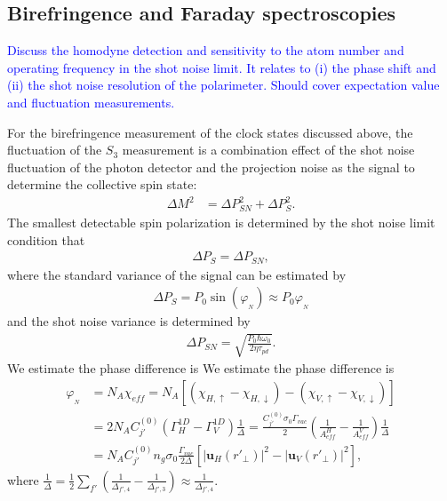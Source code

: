 \documentclass[preprint,aps,pra,onecolumn]{revtex4-1} %
\begin{document}
\subsection{Birefringence and Faraday spectroscopies}

\textcolor{blue}{Discuss the homodyne detection and sensitivity to the atom number and operating frequency in the shot noise limit.  It relates to (i) the phase shift and (ii) the shot noise resolution of the polarimeter. Should cover expectation value and fluctuation measurements.}

For the birefringence measurement of the clock states discussed above, the fluctuation of the $ S_3 $ measurement is a combination effect of the shot noise fluctuation of the photon detector and the projection noise as the signal to determine the collective spin state:
\begin{align}
\Delta M^2 &= \Delta P^2_{SN} + \Delta P^2_S .
\end{align}
The smallest detectable spin polarization is determined by the shot noise limit condition that 
\begin{align}
\Delta P_S = \Delta P_{SN},
\end{align}
where the standard variance of the signal can be estimated by
\begin{align}
\Delta P_S=P_0 \sin(\varphi_{_N}) \approx P_0 \varphi_{_N}
\end{align}
and the shot noise variance is determined by
\begin{align}
\Delta P_{SN} = \sqrt{\frac{P_0 \hbar \omega_0 }{2\eta \tau_{pd}}}.
\end{align}
We estimate the phase difference is
We estimate the phase difference is
\begin{align}
\varphi_{_N} &= N_A \chi_{e\!f\!f}=N_A [(\chi_{H,\uparrow}-\chi_{H,\downarrow})-(\chi_{V,\uparrow}-\chi_{V,\downarrow})]\\
&= 2N_AC_{j'}^{(0)}(\Gamma_{H}^{1D}-\Gamma_V^{1D})\frac{1}{\Delta}=\frac{C_{j'}^{(0)}\sigma_0\Gamma_{vac}}{2}(\frac{1}{A^H_{e\!f\!f}}-\frac{1}{A^V_{e\!f\!f}})\frac{1}{\Delta}\\
&=N_AC_{j'}^{(0)}n_g\sigma_0\frac{\Gamma_{vac}}{2\Delta}\left[| \mathbf{u}_H(r'_{\!\perp})|^2- | \mathbf{u}_V(r'_{\!\perp})|^2 \right],
\end{align}
where $\frac{1}{\Delta}=\frac{1}{2}\sum_{f'}(\frac{1}{\Delta_{f',4}}-\frac{1}{\Delta_{f',3}})\approx \frac{1}{\Delta_{f',4}}$.
\end{document}
